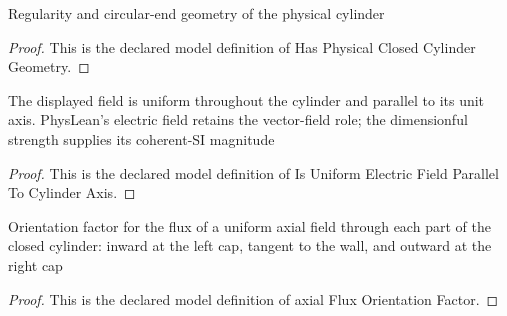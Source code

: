 \begin{definition}
  \label{def:physics:phyx-mini-0846:phyxminiproblems-problemphyxmini0846-hasphysicalclosedcylindergeometry}
  Regularity and circular-end geometry of the physical cylinder
\end{definition}
\begin{proof}
  This is the declared model definition of Has Physical Closed Cylinder Geometry.
\end{proof}
\begin{definition}
  \label{def:physics:phyx-mini-0846:phyxminiproblems-problemphyxmini0846-isuniformelectricfieldparalleltocylinderaxis}
  The displayed field is uniform throughout the cylinder and parallel to its unit axis. PhysLean's electric field retains the vector-field role; the dimensionful strength supplies its coherent-SI magnitude
\end{definition}
\begin{proof}
  This is the declared model definition of Is Uniform Electric Field Parallel To Cylinder Axis.
\end{proof}
\begin{definition}
  \label{def:physics:phyx-mini-0846:phyxminiproblems-problemphyxmini0846-axialfluxorientationfactor}
  Orientation factor for the flux of a uniform axial field through each part of the closed cylinder: inward at the left cap, tangent to the wall, and outward at the right cap
\end{definition}
\begin{proof}
  This is the declared model definition of axial Flux Orientation Factor.
\end{proof}
